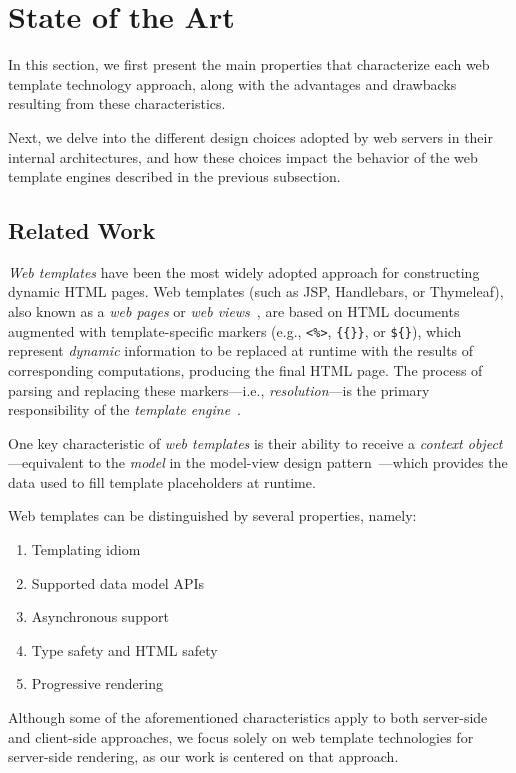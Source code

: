 \section{State of the Art}

In this section, we first present the main properties that characterize each web
template technology approach, along with the advantages and drawbacks resulting
from these characteristics.

Next, we delve into the different design choices adopted by web servers in their
internal architectures, and how these choices impact the behavior of the web
template engines described in the previous subsection.

\subsection{Related Work}

\textit{Web templates} have been the most widely adopted approach for
constructing dynamic HTML pages.
Web templates (such as JSP, Handlebars, or Thymeleaf), also known as a
\textit{web pages} or \textit{web views}~\cite{Fowler02,Alur01}, are based on
HTML documents augmented with template-specific markers (e.g., \texttt{<\%>},
\texttt{\{\{\}\}}, or \texttt{\$\{\}}), which represent \textit{dynamic}
information to be replaced at runtime with the results of corresponding
computations, producing the final HTML page.
The process of parsing and replacing these markers---i.e.,
\textit{resolution}---is the primary responsibility of the \textit{template
engine}~\cite{Parr04}.

One key characteristic of \textit{web templates} is their ability to receive a 
\textit{context object}---equivalent to the \textit{model} in the model-view 
design pattern~\cite{mvc88,Parr04}---which provides the data used to fill 
template placeholders at runtime.

Web templates can be distinguished by several properties, namely:
\begin{enumerate}
    \item Templating idiom
    \item Supported data model APIs
    \item Asynchronous support
    \item Type safety and HTML safety
    \item Progressive rendering
\end{enumerate}

Although some of the aforementioned characteristics apply to both server-side 
and client-side approaches, we focus solely on web template technologies for 
server-side rendering, as our work is centered on that approach.

